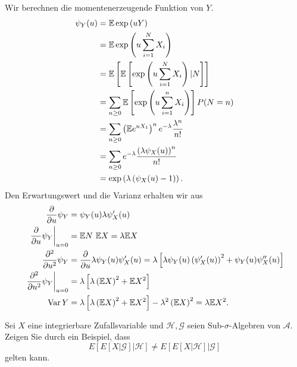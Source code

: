 \solution Wir berechnen die momentenerzeugende Funktion von $Y$.
\begin{align*}
    \psi_Y(u) &= \mathbb{E} \exp \left( uY \right) \\
    &= \mathbb{E} \exp \left( u\sum_{i=1}^{N} X_i \right) \\
    &= \mathbb{E} \left[\mathbb{E} \left[ \exp\left( u\sum_{i=1}^{N} X_i \right) | N \right] \right] \\ 
    &= \sum_{n \geq 0} \mathbb{E}\left[ \exp\left( u\sum_{i=1}^{n} X_i \right) \right] P(N=n) \\
    &= \sum_{n\geq 0} \left( \mathbb{E} e^{u X_1} \right)^n e^{-\lambda} \frac{\lambda^n}{n!} \\
    &= \sum_{n\geq 0} e^{-\lambda} \frac{\left( \lambda \psi_X(u) \right)^n}{n!} \\
    &= \exp \left( \lambda \left( \psi_X(u) -1 \right) \right).
\end{align*}
Den Erwartungswert und die Varianz erhalten wir aus
\begin{align*}
    \frac{\partial}{\partial u} \psi_Y &= 
    \psi_Y(u) \lambda \psi_X'(u) \\
    \left. \frac{\partial}{\partial u} \psi_Y \right|_{u=0} &= 
    \mathbb{E} N \ \mathbb{E} X = \lambda \mathbb{E} X \\
    \frac{\partial^2}{\partial u^2} \psi_Y &= 
    \frac{\partial}{\partial u} \lambda \psi_Y(u) \psi_X'(u) =
    \lambda \left[ \lambda \psi_Y(u) \left( \psi_X'(u) \right)^2 + \psi_Y(u)\psi_X''(u) \right]   \\
    \left. \frac{\partial^2}{\partial u^2} \psi_Y \right|_{u=0} &= 
    \lambda \left[ \lambda \left( \mathbb{E} X \right)^2 + \mathbb{E} X^2 \right] \\
    \operatorname{Var} Y &= \lambda \left[ \lambda \left( \mathbb{E} X \right)^2 + \mathbb{E} X^2 \right]
    - \lambda^2 \left( \mathbb{E} X \right)^2 = \lambda \mathbb{E} X^2.
\end{align*}






 Sei $X$ eine integrierbare Zufallsvariable
und $\mathcal H, \mathcal G$ seien Sub-$\sigma$-Algebren von $\mathcal A$. 
Zeigen Sie durch ein Beispiel, dass 
\begin{equation*}
	E\left[ E\left[ X | \mathcal G \right] | \mathcal H \right] \neq
	E\left[ E\left[ X | \mathcal H \right] | \mathcal G \right]
\end{equation*}
gelten kann. 


